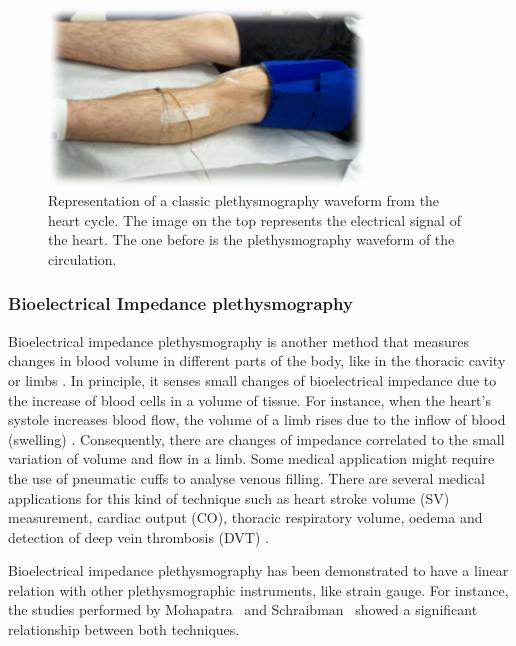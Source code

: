 \begin{figure}[!htpb]
	\centering
	\includegraphics[width=0.75\textwidth,keepaspectratio,trim={0.5cm 0.5cm 0.5cm 0.5cm}, clip]{figure6}    
	\caption[Strain gauge plethysmography]{Representation of a classic plethysmography waveform from the heart cycle. The image on the top represents the electrical signal of the heart. The one before is the plethysmography waveform of the circulation.}
	\label{fig:strain gauge}
\end{figure}

\subsubsection{Bioelectrical Impedance plethysmography}
\label{section literature BI}
Bioelectrical impedance plethysmography is another method that measures changes in blood volume in different parts of the body, like in the thoracic cavity or limbs \cite{bera2014bioelectrical}. In principle, it senses small changes of bioelectrical impedance due to the increase of blood cells in a volume of tissue. For instance, when the heart’s systole increases blood flow, the volume of a limb rises due to the inflow of blood (swelling) \cite{martinsen2011bioimpedance}. Consequently, there are changes of impedance correlated to the small variation of volume and flow in a limb. Some medical application might require the use of pneumatic cuffs to analyse venous filling. There are several medical applications for this kind of technique such as heart stroke volume (SV) measurement, cardiac output (CO), thoracic respiratory volume, oedema and detection of deep vein thrombosis (DVT) \cite{holohan1996plethysmography}. 

Bioelectrical impedance plethysmography has been demonstrated to have a linear relation with other plethysmographic instruments, like strain gauge. For instance, the studies performed by Mohapatra~\cite{mohapatra1979measurement} and Schraibman~\cite{schraibman1975comparison} showed a significant relationship between both techniques.

